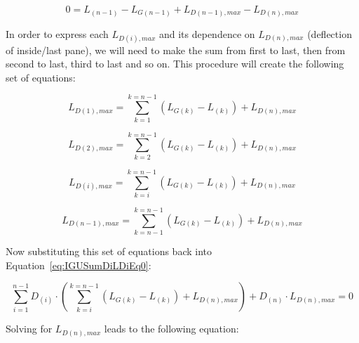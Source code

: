 \begin{equation}
0 = {L_{\left( {n - 1} \right)}} - {L_{G\left( {n - 1} \right)}} + {L_{D\left( {n - 1} \right),max}} - {L_{D\left( n \right),max}}
\end{equation}

In order to express each \({L_{D\left( i \right),max}}\) and its dependence on \({L_{D\left( n \right),max}}\) (deflection of inside/last pane), we will need to make the sum from first to last, then from second to last, third to last and so on. This procedure will create the following set of equations:

\begin{equation}
{L_{D\left( 1 \right),max}} = \mathop \sum \limits_{k = 1}^{k = n - 1} \left( {{L_{G\left( k \right)}} - {L_{\left( k \right)}}} \right) + {L_{D\left( n \right),max}}
\label{eq:IGULD1max}
\end{equation}

\begin{equation}
{L_{D\left( 2 \right),max}} = \mathop \sum \limits_{k = 2}^{k = n - 1} \left( {{L_{G\left( k \right)}} - {L_{\left( k \right)}}} \right) + {L_{D\left( n \right),max}}
\end{equation}

\begin{equation}
{L_{D\left( i \right),max}} = \mathop \sum \limits_{k = i}^{k = n - 1} \left( {{L_{G\left( k \right)}} - {L_{\left( k \right)}}} \right) + {L_{D\left( n \right),max}}
\end{equation}

\begin{equation}
{L_{D\left( {n - 1} \right),max}} = \mathop \sum \limits_{k = n - 1}^{k = n - 1} \left( {{L_{G\left( k \right)}} - {L_{\left( k \right)}}} \right) + {L_{D\left( n \right),max}}
\label{eq:IGULDn-1max}
\end{equation}

Now substituting this set of equations back into Equation~\ref{eq:IGUSumDiLDiEq0}:

\begin{equation}
\mathop \sum \limits_{i = 1}^{n - 1} {D_{\left( i \right)}}\cdot \left( {\mathop \sum \limits_{k = i}^{k = n - 1} \left( {{L_{G\left( k \right)}} - {L_{\left( k \right)}}} \right) + {L_{D\left( n \right),max}}} \right) + {D_{\left( n \right)}}\cdot {L_{D\left( n \right),max}} = 0
\end{equation}

Solving for \({L_{D\left( n \right),max}}\) leads to the following equation:

